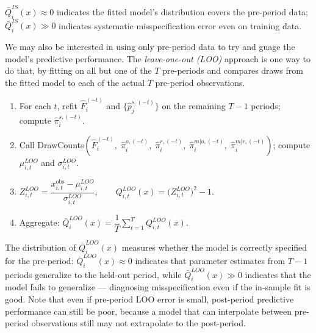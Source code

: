 \documentclass[source/paper/main.tex]{subfiles}
\begin{document}
$\bar{Q}_i^{IS}(x) \approx 0$ indicates the fitted model's distribution covers the pre-period data; $\bar{Q}_i^{IS}(x) \gg 0$ indicates systematic misspecification error even on training data.

We may also be interested in using only pre-period data to try and guage the model's predictive performance.
The \emph{leave-one-out (LOO)} approach is one way to do that, by fitting on all but one of the $T$ pre-periods and compares draws from the fitted model to each of the actual $T$ pre-period observations.
\begin{enumerate}
    \item For each $t$, refit $\hat{F}_i^{(-t)}$ and $\{\hat{p}_j^{s,(-t)}\}$ on the remaining $T-1$ periods; compute $\hat{\pi}_i^{s,(-t)}$.
    \item Call DrawCounts$(\hat{F}_i^{(-t)},\;\hat{\pi}_i^{o,(-t)},\;\hat{\pi}_i^{r,(-t)},\;\hat{\pi}_i^{m|o,(-t)},\;\hat{\pi}_i^{m|r,(-t)})$; compute $\mu_{i,t}^{LOO}$ and $\sigma_{i,t}^{LOO}$.
    \item $Z_{i,t}^{LOO} = \dfrac{x_{i,t}^{\mathrm{obs}} - \mu_{i,t}^{LOO}}{\sigma_{i,t}^{LOO}}, \qquad Q_{i,t}^{LOO}(x) = \bigl(Z_{i,t}^{LOO}\bigr)^2 - 1.$
    \item Aggregate: $\bar{Q}_i^{LOO}(x) = \dfrac{1}{T}\displaystyle\sum_{t=1}^T Q_{i,t}^{LOO}(x)$.
\end{enumerate}
The distribution of $\bar{Q}_i^{LOO}(x)$ measures whether the model is correctly specified for the pre-period: $\bar{Q}_i^{LOO}(x) \approx 0$ indicates that parameter estimates from $T-1$ periods generalize to the held-out period, while $\bar{Q}_i^{LOO}(x) \gg 0$ indicates that the model fails to generalize --- diagnosing misspecification even if the in-sample fit is good.
Note that even if pre-period LOO error is small, post-period predictive performance can still be poor, because a model that can interpolate between pre-period observations still may not extrapolate to the post-period.

\end{document}

